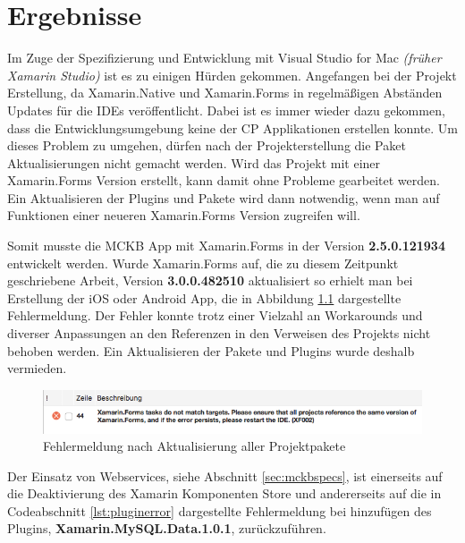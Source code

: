 %
%
% 
% 


\chapter{Ergebnisse}
\label{chap:xamarinformsresults}

	Im Zuge der Spezifizierung und Entwicklung mit Visual Studio for Mac \textit{(früher Xamarin Studio)} ist es zu einigen Hürden gekommen. Angefangen bei der Projekt Erstellung, da Xamarin.Native und Xamarin.Forms in regelmäßigen Abständen Updates für die IDEs veröffentlicht. Dabei ist es immer wieder dazu gekommen, dass die Entwicklungsumgebung keine der CP Applikationen erstellen konnte. Um dieses Problem zu umgehen, dürfen nach der Projekterstellung die Paket Aktualisierungen nicht gemacht werden. Wird das Projekt mit einer Xamarin.Forms Version erstellt, kann damit ohne Probleme gearbeitet werden. Ein Aktualisieren der Plugins und Pakete wird dann notwendig, wenn man auf Funktionen einer neueren Xamarin.Forms Version zugreifen will.

	Somit musste die MCKB App mit Xamarin.Forms in der Version \textbf{2.5.0.121934} entwickelt werden. Wurde Xamarin.Forms auf, die zu diesem Zeitpunkt geschriebene Arbeit, Version \textbf{3.0.0.482510} aktualisiert so erhielt man bei Erstellung der iOS oder Android App, die in Abbildung \ref{fig:xamarinbuilderror} dargestellte Fehlermeldung. Der Fehler konnte trotz einer Vielzahl an Workarounds und diverser Anpassungen an den Referenzen in den Verweisen des Projekts nicht behoben werden. Ein Aktualisieren der Pakete und Plugins wurde deshalb vermieden.

	\begin{figure}[h!]
		\centering
		\includegraphics[width=1\textwidth]{images/Xamarin-Upgrade-Error.png}
		\caption{Fehlermeldung nach Aktualisierung aller Projektpakete}
		\label{fig:xamarinbuilderror}
	\end{figure}

	\newpage
	Der Einsatz von Webservices, siehe Abschnitt \ref{sec:mckbspecs}, ist einerseits auf die Deaktivierung des Xamarin Komponenten Store und andererseits auf die in Codeabschnitt \ref{lst:pluginerror} dargestellte Fehlermeldung bei hinzufügen des Plugins, \textbf{Xamarin.MySQL.Data.1.0.1}, zurückzuführen.

